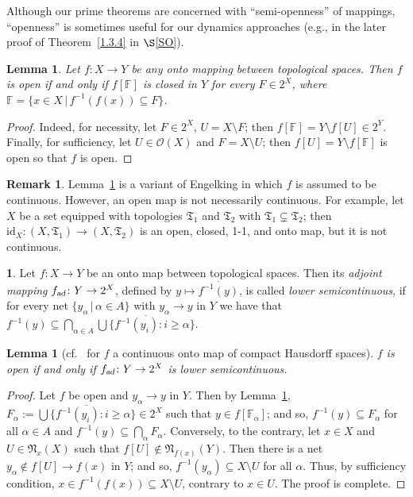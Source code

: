 \documentclass[12pt,final,3p,times]{elsarticle}
\newtheorem{slem}[sthm]{Lemma}
\theoremstyle{definition}
\newtheorem{srem}[sthm]{Remark}
\newtheorem{sse}[sthm]{}
\numberwithin{equation}{section}
\begin{document}
Although our prime theorems are concerned with ``semi-openness'' of mappings, ``openness'' is sometimes useful for our dynamics approaches (e.g., in the later proof of Theorem~\ref{1.3.4} in $\S$\ref{SO}).
\begin{slem}\label{P2.1.1}
Let $f\colon X\rightarrow Y$ be any onto mapping between topological spaces. Then $f$ is open if and only if  $f[\mathbb{F}]$ is closed in $Y$ for every $F\in2^X$, where $\mathbb{F}=\{x\in X\,|\,f^{-1}(f(x))\subseteq F\}$.
\end{slem}

\begin{proof}
Indeed, for necessity, let $F\in 2^X$, $U=X\setminus F$; then $f[\mathbb{F}]=Y\setminus f[U]\in 2^Y$. Finally, for sufficiency, let $U\in\mathscr{O}(X)$ and $F=X\setminus U$; then  $f[U]=Y\setminus f[\mathbb{F}]$ is open so that $f$ is open.
\end{proof}

\begin{srem}\label{P2.1.2}
Lemma~\ref{P2.1.1} is a variant of Engelking \cite[Thm.~4.1.12]{E89} in which $f$ is assumed to be continuous. However, an open map is not necessarily continuous. For example, let $X$ be a set equipped with topologies $\mathfrak{T}_1$ and $\mathfrak{T}_2$ with $\mathfrak{T}_1\varsubsetneq\mathfrak{T}_2$; then $\textrm{id}_X\colon(X,\mathfrak{T}_1)\rightarrow(X,\mathfrak{T}_2)$ is an open, closed, 1-1, and onto map, but it is not continuous.
\end{srem}

\begin{sse}\label{P2.1.3}
Let $f\colon X\rightarrow Y$ be an onto map between topological spaces. Then its \textit{adjoint mapping} $f_\textsl{ad}\colon Y\rightarrow2^X$, defined by $y\mapsto \overline{f^{-1}(y)}$, is called \textit{lower semicontinuous}, if for every net $\{y_\alpha\,|\,\alpha\in A\}$ with $y_\alpha\to y$ in $Y$ we have that $f^{-1}(y)\subseteq\bigcap_{\alpha\in A}\overline{\bigcup\{f^{-1}(y_i)\colon i\ge\alpha\}}$. 
\end{sse}

\begin{slem}[{cf.~\cite[Thm.~II.1.3d]{Wo} for $f$ a continuous onto map of compact Hausdorff spaces}]\label{2.1.4}
$f$ is open if and only if $f_\textsl{ad}\colon Y\rightarrow 2^X$ is lower semicontinuous.
\end{slem}

\begin{proof}
Let $f$ be open and $y_\alpha\to y$ in $Y$. Then by Lemma~\ref{P2.1.1}, $F_\alpha:=\overline{\bigcup\{f^{-1}(y_i)\colon i\ge \alpha\}}\in2^X$ such that $y\in f[\mathbb{F}_\alpha]$; and so, $f^{-1}(y)\subseteq F_\alpha$ for all $\alpha\in A$ and $f^{-1}(y)\subseteq\bigcap_{\alpha}F_\alpha$. Conversely, to the contrary, let $x\in X$ and $U\in\mathfrak{N}_x(X)$ such that $f[U]\notin\mathfrak{N}_{f(x)}(Y)$. Then there is a net $y_\alpha\notin f[U]\to f(x)$ in $Y$; and so, $f^{-1}(y_\alpha)\subseteq X\setminus U$ for all $\alpha$. Thus, by sufficiency condition, $x\in f^{-1}(f(x))\subseteq X\setminus U$, contrary to $x\in U$. The proof is complete.
\end{proof}
\end{document}
